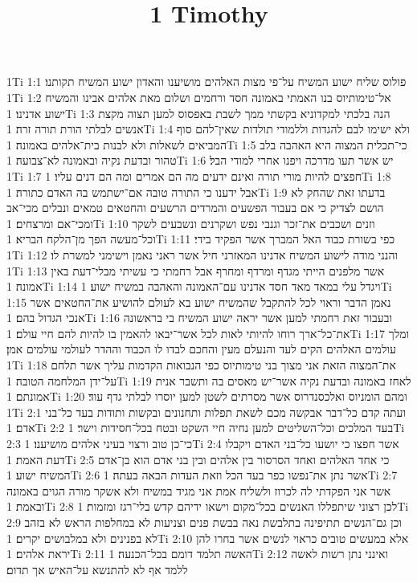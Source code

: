 

\title{1 Timothy}

1Ti 1:1  פולוס שליח ישוע המשיח על־פי מצות האלהים מושיענו והאדון ישוע המשיח תקותנו׃
1Ti 1:2  אל־טימותיוס בנו האמתי באמונה חסד ורחמים ושלום מאת אלהים אבינו והמשיח ישוע אדנינו׃
1Ti 1:3  הנה בלכתי למקדוניא בקשתי ממך לשבת באפסוס למען תצוה מקצת אנשים לבלתי הורת תורה זרה׃
1Ti 1:4  ולא ישימו לבם להגדות וללמודי תולדות שאין־להם סוף המביאים לשאלות ולא לבנות בית־אלהים באמונה׃
1Ti 1:5  כי־תכלית המצוה היא האהבה בלב טהור ובדעת נקיה ובאמונה לא־צבועה׃
1Ti 1:6  יש אשר תעו מדרכה ויפנו אחרי למודי הבל׃
1Ti 1:7  חפצים להיות מורי תורה ואינם ידעים מה הם אמרים ומה הם דנים עליו׃
1Ti 1:8  אבל ידענו כי התורה טובה אם־ישתמש בה האדם כתורה׃
1Ti 1:9  בדעתו זאת שהחק לא הושם לצדיק כי אם בעבור הפשעים והמרדים הרשעים והחטאים טמאים ונבלים מכי־אב ומכי־אם ומרצחים׃
1Ti 1:10  וזנים ושכבים את־זכר וגנבי נפש ושקרנים ונשבעים לשקר וכל־מעשה הפך מן־הלקח הבריא׃
1Ti 1:11  כפי בשורת כבוד האל המברך אשר הפקיד בידי׃
1Ti 1:12  והנני מודה לישוע המשיח אדנינו המאזרני חיל אשר ראני נאמן וישימני למשרת לו׃
1Ti 1:13  אשר מלפנים הייתי מגדף ומרדף ומחרף אבל רחמתי כי עשיתי מבלי־דעת באין אמונה׃
1Ti 1:14  ויגדל עלי במאד מאד חסד אדנינו עם־האמונה והאהבה במשיח ישוע׃
1Ti 1:15  נאמן הדבר וראוי לכל להתקבל שהמשיח ישוע בא לעולם להושיע את־החטאים אשר אנכי הגדול בהם׃
1Ti 1:16  ובעבור זאת רחמתי למען אשר יראה ישוע המשיח בי בראשונה את־כל־ארך רוחו להיותי לאות לכל אשר־יבאו להאמין בו להיות להם חיי עולם׃
1Ti 1:17  ומלך עולמים האלהים הקים לעד והנעלם מעין והחכם לבדו לו הכבוד וההדר לעולמי עולמים אמן׃
1Ti 1:18  את־המצוה הזאת אני מצוך בני טימותיוס כפי הנבואות הקדמות עליך אשר תלחם על־ידן המלחמה הטובה׃
1Ti 1:19  לאחז באמונה ובדעת נקיה אשר־יש מאסים בה ותשבר אנית אמונתם׃
1Ti 1:20  ומהם הומניוס ואלכסנדרוס אשר מסרתים לשטן למען יוסרו לבלתי גדף עוד׃
1Ti 2:1  ועתה קדם כל־דבר אבקשה מכם לשאת תפלות ותחנונים ובקשות ותודות בעד כל־בני אדם׃
1Ti 2:2  בעד המלכים וכל־השליטים למען נחיה חיי השקט ובטח בכל־חסידות וישר׃
1Ti 2:3  כי־כן טוב ורצוי בעיני אלהים מושיענו׃
1Ti 2:4  אשר חפצו כי יושעו כל־בני האדם ויקבלו דעת האמת׃
1Ti 2:5  כי אחד האלהים ואחד הסרסור בין אלהים ובין בני אדם הוא בן־אדם המשיח ישוע׃
1Ti 2:6  אשר נתן את־נפשו כפר בעד הכל וזאת העדות הבאה בעתה׃
1Ti 2:7  אשר אני הפקדתי לה לכרוז ולשליח אמת אני מגיד במשיח ולא אשקר מורה הגוים באמונה ובאמת׃
1Ti 2:8  לכן רצוני שיתפללו האנשים בכל־מקום וישאו ידיהם קדש בלי־רגז ומזמות׃
1Ti 2:9  וכן גם־הנשים תתיפינה בתלבשת נאה בבשת פנים וצניעות לא במחלפות הראש לא בזהב לא בפנינים ולא במלבושים יקרים׃
1Ti 2:10  אלא במעשים טובים כראוי לנשים אשר בחרו להן יראת אלהים׃
1Ti 2:11  האשה תלמד דומם בכל־הכנעה׃
1Ti 2:12  ואינני נתן רשות לאשה ללמד אף לא להתנשא על־האיש אך תדום׃
